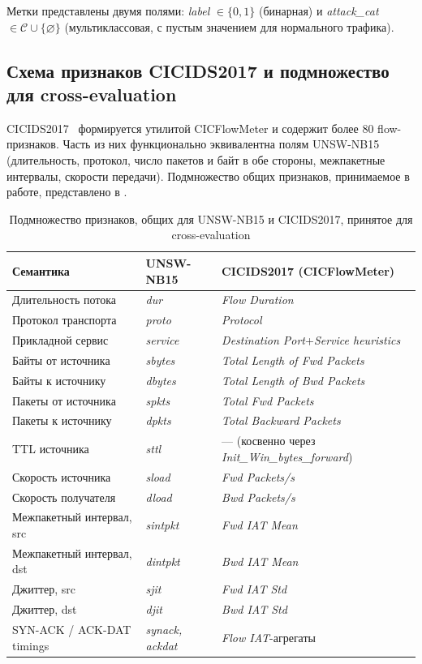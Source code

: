 Метки представлены двумя полями: \emph{label} \(\in \{0, 1\}\) (бинарная) и
\emph{attack\_cat} \(\in \mathcal{C} \cup \{\varnothing\}\) (мультиклассовая,
с пустым значением для нормального трафика).

\subsection{Схема признаков CICIDS2017 и подмножество для cross-evaluation}

CICIDS2017~\cite{sharafaldin2018toward} формируется утилитой CICFlowMeter и
содержит более 80 flow-признаков. Часть из них функционально эквивалентна
полям UNSW-NB15 (длительность, протокол, число пакетов и байт в обе
стороны, межпакетные интервалы, скорости передачи). Подмножество общих
признаков, принимаемое в работе, представлено в
.

\begin{table}[H]
\centering
\caption{Подмножество признаков, общих для UNSW-NB15 и CICIDS2017,
принятое для cross-evaluation}
\label{tab:common-features}
\renewcommand{\arraystretch}{1.25}
\begin{tabularx}{\linewidth}{@{}lll@{}}
\toprule
\textbf{Семантика} & \textbf{UNSW-NB15} & \textbf{CICIDS2017 (CICFlowMeter)} \\
\midrule
Длительность потока       & \emph{dur}      & \emph{Flow Duration} \\
Протокол транспорта        & \emph{proto}    & \emph{Protocol} \\
Прикладной сервис          & \emph{service}  & \emph{Destination Port}+\emph{Service heuristics} \\
Байты от источника         & \emph{sbytes}   & \emph{Total Length of Fwd Packets} \\
Байты к источнику          & \emph{dbytes}   & \emph{Total Length of Bwd Packets} \\
Пакеты от источника        & \emph{spkts}    & \emph{Total Fwd Packets} \\
Пакеты к источнику         & \emph{dpkts}    & \emph{Total Backward Packets} \\
TTL источника              & \emph{sttl}     & ---  (косвенно через \emph{Init\_Win\_bytes\_forward})\\
Скорость источника         & \emph{sload}    & \emph{Fwd Packets/s} \\
Скорость получателя        & \emph{dload}    & \emph{Bwd Packets/s} \\
Межпакетный интервал, src  & \emph{sintpkt}  & \emph{Fwd IAT Mean} \\
Межпакетный интервал, dst  & \emph{dintpkt}  & \emph{Bwd IAT Mean} \\
Джиттер, src               & \emph{sjit}     & \emph{Fwd IAT Std} \\
Джиттер, dst               & \emph{djit}     & \emph{Bwd IAT Std} \\
SYN-ACK / ACK-DAT timings  & \emph{synack, ackdat} & \emph{Flow IAT}-агрегаты \\
\bottomrule
\end{tabularx}
\end{table}

